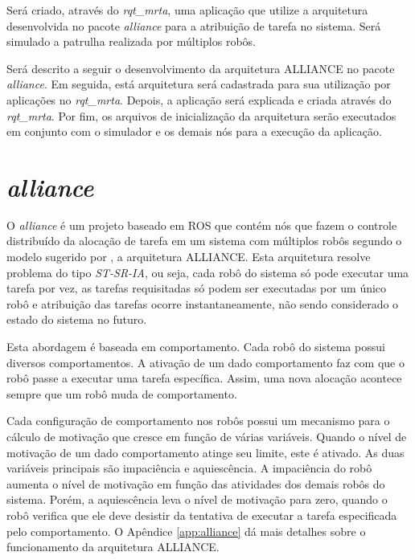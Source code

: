     Será criado, através do \textit{rqt\_mrta}, uma aplicação que utilize a arquitetura desenvolvida no pacote \textit{alliance} para a atribuição de tarefa no sistema. Será simulado a patrulha realizada por múltiplos robôs.
    
    Será descrito a seguir o desenvolvimento da arquitetura ALLIANCE no pacote \textit{alliance}. Em seguida, está arquitetura será cadastrada para sua utilização por aplicações no \textit{rqt\_mrta}. Depois, a aplicação será explicada e criada através do \textit{rqt\_mrta}. Por fim, os arquivos de inicialização da arquitetura serão executados em conjunto com o simulador e os demais nós para a execução da aplicação.

    \section{\textit{alliance}} \label{sec:alliance}
        O \textit{alliance} é um projeto baseado em ROS que contém nós que fazem o controle distribuído da alocação de tarefa em um sistema com múltiplos robôs segundo o modelo sugerido por , a arquitetura ALLIANCE. Esta arquitetura resolve problema do tipo \textit{ST-SR-IA}, ou seja, cada robô do sistema só pode executar uma tarefa por vez, as tarefas requisitadas só podem ser executadas por um único robô e atribuição das tarefas ocorre instantaneamente, não sendo considerado o estado do sistema no futuro.
        
        Esta abordagem é baseada em comportamento. Cada robô do sistema possui diversos comportamentos. A ativação de um dado comportamento faz com que o robô passe a executar uma tarefa específica. Assim, uma nova alocação acontece sempre que um robô muda de comportamento. 
        
        Cada configuração de comportamento nos robôs possui um mecanismo para o cálculo de motivação que cresce em função de várias variáveis. Quando o nível de motivação de um dado comportamento atinge seu limite, este é ativado. As duas variáveis principais são impaciência e aquiescência. A impaciência do robô aumenta o nível de motivação em função das atividades dos demais robôs do sistema. Porém, a aquiescência leva o nível de motivação para zero, quando o robô verifica que ele deve desistir da tentativa de executar a tarefa especificada pelo comportamento. O Apêndice \ref{app:alliance} dá mais detalhes sobre o funcionamento da arquitetura ALLIANCE.
        
